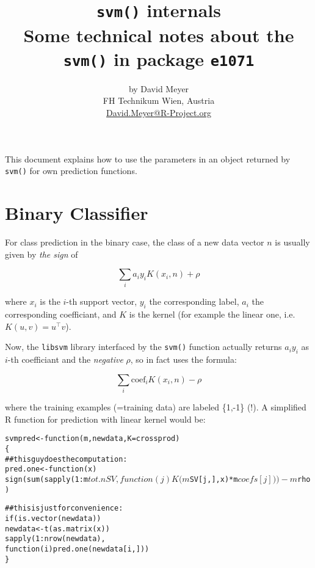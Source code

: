\documentclass[a4paper]{article}
\newcommand{\pkg}[1]{\texttt{#1}}
\newenvironment{smallexample}{\begin{alltt}\small}{\end{alltt}}
\begin{document}





\title{\texttt{svm()} internals\\ 
\large Some technical notes about the \texttt{svm()} in package \pkg{e1071}}
\author{by David Meyer\\
  FH Technikum Wien, Austria\\
\url{David.Meyer@R-Project.org}
}
\maketitle
\sloppy

This document explains how to use the parameters in an object returned
by \texttt{svm()} for own prediction functions.

\section{Binary Classifier}

For class prediction in the binary case, the class of a new data vector
$n$ is usually given by \emph{the sign} of

\begin{equation}
\sum_i{a_i y_i K(x_i, n)} + \rho
\end{equation}

\noindent where $x_i$ is the $i$-th support vector, $y_i$ the
corresponding label, $a_i$ the corresponding coefficiant, and $K$ is
the kernel (for example the linear one, i.e. $K(u,v) = u ^{\top} v$).


Now, the \texttt{libsvm} library interfaced by the \texttt{svm()} function
actually returns $a_i y_i$ as $i$-th coefficiant and the
\emph{negative} $\rho$, so in fact uses the formula:

\[
\sum_i{\mathrm{coef}_i K(x_i, n)} - \rho
\] 

\noindent where the training examples (=training data) are labeled \{1,-1\} (!).
A simplified \textsf{R} function for prediction with linear kernel would be:

\begin{smallexample}

svmpred <- function (m, newdata, K=crossprod) 
\{
  ## this guy does the computation:
  pred.one <- function (x)
      sign(sum(sapply(1:m$tot.nSV, function (j)
                      K(m$SV[j,], x) * m$coefs[j]
                      )
               ) - m$rho
           )

  ## this is just for convenience:
  if (is.vector(newdata))
      newdata <- t(as.matrix(x))
  sapply (1:nrow(newdata),
          function (i) pred.one(newdata[i,]))
\}

\end{smallexample}
\end{document}
